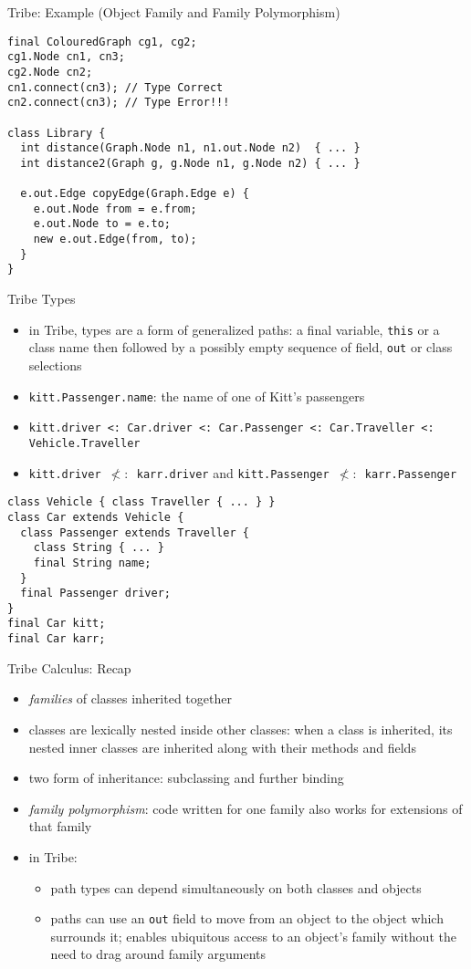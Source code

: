 \documentclass{beamer}
\begin{document}
\begin{frame}[fragile]{Tribe: Example (Object Family and Family Polymorphism)}
\begin{verbatim}
final ColouredGraph cg1, cg2;
cg1.Node cn1, cn3;
cg2.Node cn2;
cn1.connect(cn3); // Type Correct
cn2.connect(cn3); // Type Error!!!

class Library {
  int distance(Graph.Node n1, n1.out.Node n2)  { ... }
  int distance2(Graph g, g.Node n1, g.Node n2) { ... }

  e.out.Edge copyEdge(Graph.Edge e) {
    e.out.Node from = e.from;
    e.out.Node to = e.to;
    new e.out.Edge(from, to);
  }
}
\end{verbatim}
\end{frame}

\begin{frame}[fragile]{Tribe Types}
\begin{itemize}
\item in Tribe, types are a form of generalized paths: a final
  variable, {\tt this} or a class name then followed by a possibly
  empty sequence of field, {\tt out} or class selections
\item {\tt kitt.Passenger.name}: the name of one of Kitt's passengers
\item {\tt kitt.driver <: Car.driver <: Car.Passenger <: Car.Traveller <:
  Vehicle.Traveller}
\item {\tt kitt.driver $\not<:$ karr.driver} and {\tt kitt.Passenger $\not<:$ karr.Passenger}
\end{itemize}
\begin{verbatim}
class Vehicle { class Traveller { ... } }
class Car extends Vehicle {
  class Passenger extends Traveller {
    class String { ... }
    final String name;
  }
  final Passenger driver;
}
final Car kitt;
final Car karr;
\end{verbatim}
\end{frame}

\begin{frame}{Tribe Calculus: Recap}
\begin{itemize}
\item {\it families} of classes inherited together
\item classes are lexically nested inside other classes: when a class
  is inherited, its nested inner classes are inherited along with
  their methods and fields
\item two form of inheritance: subclassing and further binding
\item {\it family polymorphism}: code written for one family
  also works for extensions of that family
\item in Tribe:\begin{itemize}
\item path types can depend simultaneously on both classes and objects
\item paths can use an {\tt out} field to move from an object to the
  object which surrounds it; enables ubiquitous access to an object's
  family without the need to drag around family arguments
\end{itemize}
\end{itemize}
\end{frame}
\end{document}
